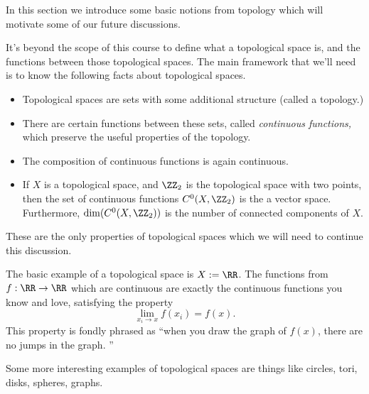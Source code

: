 \begin{elevator}
In this section we introduce some basic notions from topology which will motivate some of our future discussions.
\end{elevator}
\label{hom:sec:connectedcomplex}
It's beyond the scope of this course to define what a topological space is, and the functions between those topological spaces.
The main framework that we'll need is to know the following facts about topological spaces.
\begin{itemize}
    \item Topological spaces are sets with some additional structure (called a topology.)
    \item There are certain functions between these sets, called \emph{continuous functions,} which preserve the useful properties of the topology.
    \item The composition of continuous functions is again continuous. 
    \item If $X$ is a topological space, and $\ZZ_2$ is the topological space with two points, then the set of continuous functions $C^0(X, \ZZ_2)$ is the a vector space. Furthermore, $\dim(C^0(X, \ZZ_2))$ is the number of connected components of $X$. 
\end{itemize}
These are the only properties of topological spaces which we will need to continue this discussion. 
\begin{example}
    The basic example of a topological space is $X:=\RR$. The functions from $f:\RR\to \RR$ which are continuous are exactly the continuous functions you know and love, satisfying the property
    \[\lim_{x_i\to x} f(x_i)=f(x).\]
    This property is fondly phrased as ``when you draw the graph of $f(x)$, there are no jumps in the graph. ''
\end{example}
Some more interesting examples of topological spaces are things like circles, tori, disks, spheres, graphs. 
